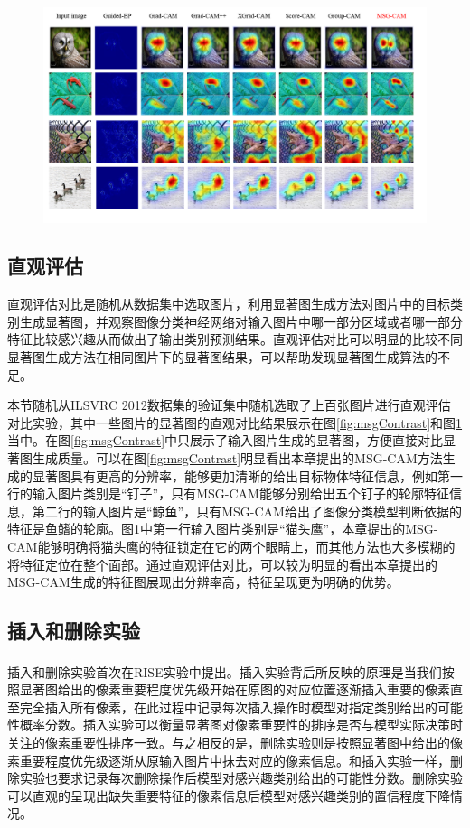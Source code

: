 \begin{figure}[h]
	\centering 
	\includegraphics[width=15cm]{fig/ch3/msgContrast2.png}
	\label{fig:msgContrast2}
\end{figure}
\subsection{直观评估}
直观评估对比是随机从数据集中选取图片，利用显著图生成方法对图片中的目标类别生成显著图，并观察图像分类神经网络对输入图片中哪一部分区域或者哪一部分特征比较感兴趣从而做出了输出类别预测结果。直观评估对比可以明显的比较不同显著图生成方法在相同图片下的显著图结果，可以帮助发现显著图生成算法的不足。

本节随机从ILSVRC 2012数据集的验证集中随机选取了上百张图片进行直观评估对比实验，其中一些图片的显著图的直观对比结果展示在图\ref{fig:msgContrast}和图\ref{fig:msgContrast2}当中。在图\ref{fig:msgContrast}中只展示了输入图片生成的显著图，方便直接对比显著图生成质量。可以在图\ref{fig:msgContrast}明显看出本章提出的MSG-CAM方法生成的显著图具有更高的分辨率，能够更加清晰的给出目标物体特征信息，例如第一行的输入图片类别是“钉子”，只有MSG-CAM能够分别给出五个钉子的轮廓特征信息，第二行的输入图片是“鲸鱼”，只有MSG-CAM给出了图像分类模型判断依据的特征是鱼鳍的轮廓。图\ref{fig:msgContrast2}中第一行输入图片类别是“猫头鹰”，本章提出的MSG-CAM能够明确将猫头鹰的特征锁定在它的两个眼睛上，而其他方法也大多模糊的将特征定位在整个面部。通过直观评估对比，可以较为明显的看出本章提出的MSG-CAM生成的特征图展现出分辨率高，特征呈现更为明确的优势。



\subsection{插入和删除实验}
插入和删除实验首次在RISE\textsuperscript{\cite{petsiuk2018rise}}实验中提出。插入实验背后所反映的原理是当我们按照显著图给出的像素重要程度优先级开始在原图的对应位置逐渐插入重要的像素直至完全插入所有像素，在此过程中记录每次插入操作时模型对指定类别给出的可能性概率分数。插入实验可以衡量显著图对像素重要性的排序是否与模型实际决策时关注的像素重要性排序一致。与之相反的是，删除实验则是按照显著图中给出的像素重要程度优先级逐渐从原输入图片中抹去对应的像素信息。和插入实验一样，删除实验也要求记录每次删除操作后模型对感兴趣类别给出的可能性分数。删除实验可以直观的呈现出缺失重要特征的像素信息后模型对感兴趣类别的置信程度下降情况。

